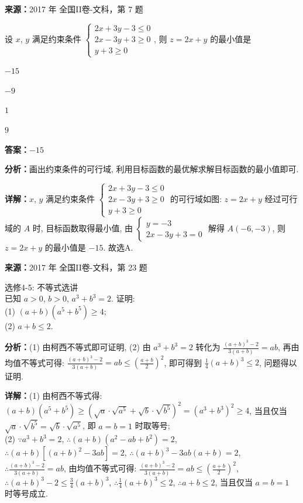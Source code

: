 \begin{question}[points=5]
\textbf{来源：}2017 年 全国II卷-文科，第 7 题\par
设 $x$, $y$ 满足约束条件 $\begin{cases} 2x+3y-3\le 0\\ 2x-3y+3\ge 0\\ y+3\ge 0\end{cases}$, 则 $z=2x+y$ 的最小值是
\begin{choices}
  \item $-15$
  \item $-9$
  \item $1$
  \item $9$
\end{choices}
\begin{solution}
\textbf{答案：}$-15$

\textbf{分析：}画出约束条件的可行域, 利用目标函数的最优解求解目标函数的最小值即可.

\textbf{详解：}$x$, $y$ 满足约束条件 $\begin{cases} 2x+3y-3\le 0\\ 2x-3y+3\ge 0\\ y+3\ge 0\end{cases}$ 的可行域如图: $z=2x+y$ 经过可行域的 $A$ 时, 目标函数取得最小值, 由 $\begin{cases} y=-3\\ 2x-3y+3=0\end{cases}$ 解得 $A(-6,-3)$, 则 $z=2x+y$ 的最小值是 $-15$. 故选A.
\end{solution}
\end{question}

\begin{question}[points=10]
\textbf{来源：}2017 年 全国II卷-文科，第 23 题\par
选修4-5: 不等式选讲 \\ 已知 $a>0$, $b>0$, $a^3+b^3=2$. 证明: \\ (1) $(a+b)(a^5+b^5)\ge4$; \\ (2) $a+b\le2$.
\begin{solution}

\textbf{分析：}(1) 由柯西不等式即可证明, (2) 由 $a^3+b^3=2$ 转化为 $\frac{(a+b)^3-2}{3(a+b)}=ab$, 再由均值不等式可得: $\frac{(a+b)^3-2}{3(a+b)}=ab\le\left(\frac{a+b}{2}\right)^2$, 即可得到 $\frac{1}{4}(a+b)^3\le2$, 问题得以证明.

\textbf{详解：}(1) 由柯西不等式得: $(a+b)(a^5+b^5)\ge(\sqrt{a}\cdot\sqrt{a^5}+\sqrt{b}\cdot\sqrt{b^5})^2=(a^3+b^3)^2\ge4$, 当且仅当 $\sqrt{a}\cdot\sqrt{b^5}=\sqrt{b}\cdot\sqrt{a^5}$, 即 $a=b=1$ 时取等号; \\ (2) $\because a^3+b^3=2$, $\therefore (a+b)(a^2-ab+b^2)=2$, $\therefore (a+b)[(a+b)^2-3ab]=2$, $\therefore (a+b)^3-3ab(a+b)=2$, $\therefore \frac{(a+b)^3-2}{3(a+b)}=ab$, 由均值不等式可得: $\frac{(a+b)^3-2}{3(a+b)}=ab\le\left(\frac{a+b}{2}\right)^2$, $\therefore (a+b)^3-2\le\frac{3}{4}(a+b)^3$, $\therefore \frac{1}{4}(a+b)^3\le2$, $\therefore a+b\le2$, 当且仅当 $a=b=1$ 时等号成立.
\end{solution}
\end{question}

